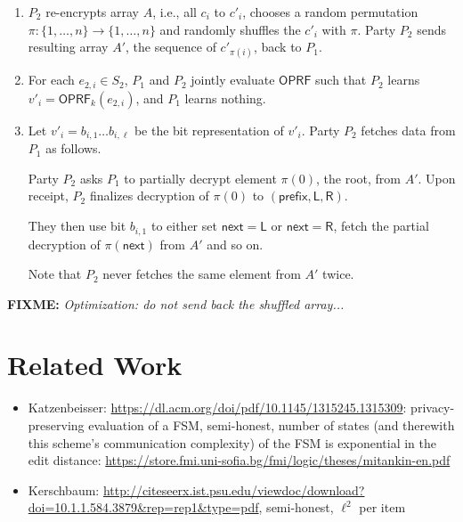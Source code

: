 \documentclass{article}
\newcommand{\oprf}[0]{\mathsf{OPRF}}
\newcommand{\enc}[0]{{\mathsf{Enc}}}
\newcommand{\fixme}[1]{{\bf FIXME:} {\emph{#1}}}
\begin{document}
{\begin{enumerate}[label={\bf Step {\arabic*}:},leftmargin=*]
  $P_1$ stores $T$ in an array $A$, so pointers $\mathsf{L}_i$ and
  $\mathsf{R}_i$ are indices of $A$'s elements. Let the number
  of nodes in $T$ and therewith the number of elements in $A$ be
  $n'$.

  \fixme{Why would $P_1$ have to shuffle $T$?}
  
  Finally, $P_1$ Elgamal encrypts each element $N_i$ of array $A$ to
  $c_i=(\enc_{pk}(\mathsf{prefix}_i),\enc_{pk}(\mathsf{L}_i),\enc_{pk}(\mathsf{R}_i))$
  and sends the $c_i$ to $P_2$.

\item $P_2$ re-encrypts array $A$, i.e., all $c_i$ to $c'_i$, chooses
  a random permutation $\pi:\{1,\ldots,n\}\rightarrow\{1,\ldots,n\}$
  and randomly shuffles the $c'_i$ with $\pi$. Party $P_2$ sends
  resulting array $A'$, the sequence of $c'_{\pi(i)}$, back to $P_1$.

\item For each $e_{2,i}\in{}S_2$, $P_1$ and $P_2$ jointly evaluate
  $\oprf$ such that $P_2$ learns $v'_i=\oprf_k(e_{2,i})$, and $P_1$
  learns nothing.

\item Let $v'_i=b_{i,1}\ldots{}b_{i,\ell}$ be the bit representation
  of $v'_i$. Party $P_2$ fetches data from $P_1$ as follows.

  Party $P_2$ asks $P_1$ to partially decrypt element $\pi(0)$, the
  root, from $A'$. Upon receipt, $P_2$ finalizes decryption of
  $\pi(0)$ to $(\mathsf{prefix},\mathsf{L},\mathsf{R})$.

  They then use bit $b_{i,1}$ to either set
  ${\mathsf{next}}=\mathsf{L}$ or ${\mathsf{next}}=\mathsf{R}$, fetch
  the partial decryption of $\pi({\mathsf{next}})$ from $A'$ and so on.

  Note that $P_2$ never fetches the same element from $A'$ twice. 
  
\end{enumerate}

\fixme{Optimization: do not send back the shuffled array...}

\section{Related Work}
\begin{itemize}
\item Katzenbeisser: \url{https://dl.acm.org/doi/pdf/10.1145/1315245.1315309}:
  privacy-preserving evaluation of a FSM, semi-honest, number of
  states (and therewith this scheme's communication complexity) of the
  FSM is exponential in the edit distance:
  \url{https://store.fmi.uni-sofia.bg/fmi/logic/theses/mitankin-en.pdf}
\item Kerschbaum: \url{http://citeseerx.ist.psu.edu/viewdoc/download?doi=10.1.1.584.3879&rep=rep1&type=pdf}, semi-honest, $\ell^2$ per item
\end{itemize}
}%
  
\end{document}
